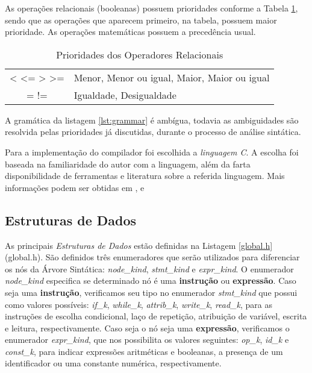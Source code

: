 As operações relacionais (booleanas) possuem prioridades conforme a Tabela
\ref{tab:prioridades}, sendo que as operações que aparecem primeiro, na
tabela, possuem maior prioridade. As operações matemáticas possuem a
precedência usual.

\begin{table}
	\begin{center}
		\begin{tabular}{c l}
			< <= > >= & Menor, Menor ou igual, Maior, Maior ou igual \\
			= !=      & Igualdade,  Desigualdade \\
		\end{tabular}
	\end{center}
	\caption{Prioridades dos Operadores Relacionais}
	\label{tab:prioridades}
\end{table}

A gramática da listagem \ref{lst:grammar} é ambígua, todavia as ambiguidades
são resolvida pelas prioridades já discutidas, durante o processo de análise
sintática.

Para a implementação do compilador foi escolhida a \emph{linguagem C}. A
escolha foi baseada na familiaridade do autor com a linguagem, além da farta
disponibilidade de ferramentas e literatura sobre a referida linguagem. Mais
informações podem ser obtidas em ,  e

\subsection{Estruturas de Dados}
As principais \emph{Estruturas de Dados} estão definidas na Listagem
\ref{global.h} (global.h). São definidos três enumeradores que serão
utilizados para diferenciar os nós da Árvore Sintática: \emph{node\_kind},
\emph{stmt\_kind} e \emph{expr\_kind}. O enumerador \emph{node\_kind}
especifica se determinado nó é uma \textbf{instrução} ou \textbf{expressão}.
Caso seja uma \textbf{instrução}, verificamos seu tipo no enumerador
\emph{stmt\_kind} que possui como valores possíveis: \emph{if\_k},
\emph{while\_k}, \emph{attrib\_k}, \emph{write\_k}, \emph{read\_k}, para as
instruções de escolha condicional, laço de repetição, atribuição de variável,
escrita e leitura, respectivamente. Caso seja o nó seja uma
\textbf{expressão}, verificamos o enumerador \emph{expr\_kind}, que nos
possibilita os valores seguintes: \emph{op\_k}, \emph{id\_k} e
\emph{const\_k}, para indicar expressões aritméticas e booleanas, a presença
de um identificador ou uma constante numérica, respectivamente.

